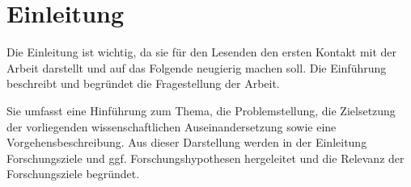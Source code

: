 

\section{Einleitung}

Die Einleitung ist wichtig, da sie für den Lesenden den ersten Kontakt mit der Arbeit darstellt und auf das Folgende neugierig machen soll. Die Einführung beschreibt und begründet die 
Fragestellung der Arbeit. 

Sie umfasst eine Hinführung zum Thema, die Problemstellung, die Zielsetzung der vorliegenden wissenschaftlichen Auseinandersetzung sowie eine Vorgehensbeschreibung. Aus dieser Darstellung werden in der Einleitung Forschungsziele und ggf. Forschungshypothesen hergeleitet und die Relevanz der Forschungsziele begründet. \parencite{cogliserReviewCognitiveDissonance2017}

\newpage
